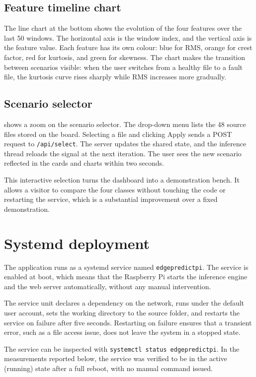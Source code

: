 \subsection{Feature timeline chart}

The line chart at the bottom shows the evolution of the four features over the last 50 windows. The horizontal axis is the window index, and the vertical axis is the feature value. Each feature has its own colour: blue for RMS, orange for crest factor, red for kurtosis, and green for skewness. The chart makes the transition between scenarios visible: when the user switches from a healthy file to a fault file, the kurtosis curve rises sharply while RMS increases more gradually.

\subsection{Scenario selector}

 shows a zoom on the scenario selector. The drop-down menu lists the 48 source files stored on the board. Selecting a file and clicking Apply sends a POST request to \texttt{/api/select}. The server updates the shared state, and the inference thread reloads the signal at the next iteration. The user sees the new scenario reflected in the cards and charts within two seconds.

This interactive selection turns the dashboard into a demonstration bench. It allows a visitor to compare the four classes without touching the code or restarting the service, which is a substantial improvement over a fixed demonstration.

\section{Systemd deployment}

The application runs as a systemd service named \texttt{edgepredictpi}. The service is enabled at boot, which means that the Raspberry Pi starts the inference engine and the web server automatically, without any manual intervention.

The service unit declares a dependency on the network, runs under the default user account, sets the working directory to the source folder, and restarts the service on failure after five seconds. Restarting on failure ensures that a transient error, such as a file access issue, does not leave the system in a stopped state.

The service can be inspected with \texttt{systemctl status edgepredictpi}. In the measurements reported below, the service was verified to be in the active (running) state after a full reboot, with no manual command issued.

